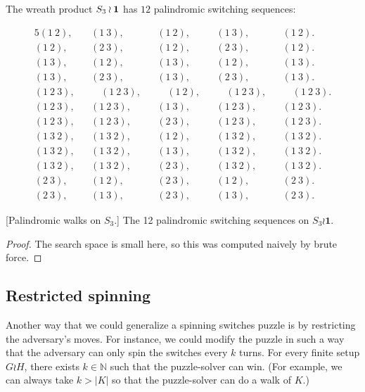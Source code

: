 \begin{proposition}
  The wreath product $S_3 \wr \bf{1}$ has $12$ palindromic switching sequences:
  \captionsetup{type=table}
  \begin{singlespace}
  \begin{alignat*}{5}
    (1~2), && (1~3), && (1~2), && (1~3), && (1~2). \\
    (1~2), && (2~3), && (1~2), && (2~3), && (1~2). \\
    (1~3), && (1~2), && (1~3), && (1~2), && (1~3). \\
    (1~3), && (2~3), && (1~3), && (2~3), && (1~3). \\
    (1~2~3), && \hspace{1em} (1~2~3), && \hspace{1em} (1~2), && \hspace{1em} (1~2~3), && \hspace{1em} (1~2~3). \\
    (1~2~3), && (1~2~3), && (1~3), && (1~2~3), && (1~2~3). \\
    (1~2~3), && (1~2~3), && (2~3), && (1~2~3), && (1~2~3). \\
    (1~3~2), && (1~3~2), && (1~2), && (1~3~2), && (1~3~2). \\
    (1~3~2), && (1~3~2), && (1~3), && (1~3~2), && (1~3~2). \\
    (1~3~2), && (1~3~2), && (2~3), && (1~3~2), && (1~3~2). \\
    (2~3), && (1~2), && (2~3), && (1~2), && (2~3). \\
    (2~3), && (1~3), && (2~3), && (1~3), && (2~3).
  \end{alignat*}
  \end{singlespace}
  [Palindromic walks on $S_3$.]{
    The 12 palindromic switching sequences on $S_3 \wr \mathbf{1}$.
  }
\end{proposition}
\begin{proof}
  The search space is small here, so this was computed naively by brute force.
\end{proof}
\subsection{Restricted spinning}
Another way that we could generalize a spinning switches puzzle
is by restricting the adversary's moves.
For instance, we could modify the puzzle in such a way that the adversary can
only spin the switches every $k$ turns.
For every finite setup $G \wr H$, there exists $k \in \mathbb N$ such that the
puzzle-solver can win.
(For example, we can always take $k > |K|$ so that the puzzle-solver can
do a walk of $K$.)

